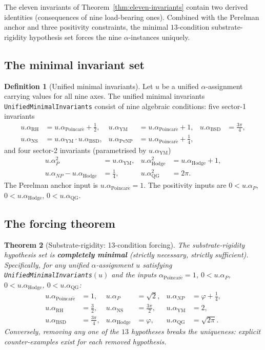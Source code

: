 \documentclass[11pt,a4paper,reqno]{amsart}
\theoremstyle{plain}
\newtheorem{theorem}{Theorem}[section]
\theoremstyle{definition}
\newtheorem{definition}[theorem]{Definition}
\theoremstyle{remark}
\newcommand{\aPo}{\alpha_{\mathrm{Poincar\acute{e}}}}
\newcommand{\aP}{\alpha_{P}}
\newcommand{\aNP}{\alpha_{NP}}
\newcommand{\aRH}{\alpha_{\mathrm{RH}}}
\newcommand{\aYM}{\alpha_{\mathrm{YM}}}
\newcommand{\aNS}{\alpha_{\mathrm{NS}}}
\newcommand{\aBSD}{\alpha_{\mathrm{BSD}}}
\newcommand{\aHodge}{\alpha_{\mathrm{Hodge}}}
\newcommand{\aQG}{\alpha_{\mathrm{QG}}}
\newcommand{\aPvNP}{\alpha_{\mathrm{PvNP}}}
\newcommand{\code}[1]{\texttt{#1}}
\begin{document}
The eleven invariants of Theorem~\ref{thm:eleven-invariants} contain
two derived identities (consequences of nine load-bearing ones).
Combined with the Perelman anchor and three positivity constraints,
the minimal $13$-condition substrate-rigidity hypothesis set forces
the nine $\alpha$-instances uniquely.

\subsection{The minimal invariant set}
\label{subsec:minimal-invariants}

\begin{definition}[Unified minimal invariants]
\label{def:unified-minimal-invariants}
Let $u$ be a unified $\alpha$-assignment carrying values for all
nine axes. The unified minimal invariants
\code{UnifiedMinimalInvariants} consist of nine algebraic conditions:
five sector-1 invariants
\begin{align*}
u.\aRH &= u.\aPo + \tfrac{1}{2}, &
u.\aYM &= u.\aPo + 1, &
u.\aBSD &= \tfrac{3\pi}{4}, \\
u.\aNS &= u.\aYM \cdot u.\aBSD, &
u.\aPvNP &= u.\aPo + \tfrac{1}{4},
\end{align*}
and four sector-2 invariants (parametrised by $u.\aYM$)
\begin{align*}
u.\aP^{2} &= u.\aYM, &
u.\aHodge^{2} &= u.\aHodge + 1, \\
u.\aNP - u.\aHodge &= \tfrac{1}{4}, &
u.\aQG^{2} &= 2\pi.
\end{align*}
The Perelman anchor input is $u.\aPo = 1$. The positivity inputs are
$0 < u.\aP$, $0 < u.\aHodge$, $0 < u.\aQG$.
\end{definition}

\subsection{The forcing theorem}
\label{subsec:forcing-theorem}

\begin{theorem}[Substrate-rigidity: 13-condition forcing]
\label{thm:substrate-rigidity}
The substrate-rigidity hypothesis set is
\textbf{completely minimal} \textup{(}strictly necessary, strictly
sufficient\textup{)}. Specifically, for any unified $\alpha$-assignment
$u$ satisfying \code{UnifiedMinimalInvariants}$(u)$ and the inputs
$\aPo = 1$, $0 < u.\aP$, $0 < u.\aHodge$, $0 < u.\aQG$:
\begin{equation}
\label{eq:nine-alphas-forced}
\begin{aligned}
u.\aPo   &= 1, &
u.\aP    &= \sqrt{2}, &
u.\aNP   &= \varphi + \tfrac{1}{4},\\
u.\aRH   &= \tfrac{3}{2}, &
u.\aNS   &= \tfrac{3\pi}{2}, &
u.\aYM   &= 2,\\
u.\aBSD  &= \tfrac{3\pi}{4}, &
u.\aHodge &= \varphi, &
u.\aQG   &= \sqrt{2\pi}.
\end{aligned}
\end{equation}
Conversely, removing any one of the $13$ hypotheses breaks the
uniqueness: explicit counter-examples exist for each removed
hypothesis.
\end{theorem}
\end{document}
